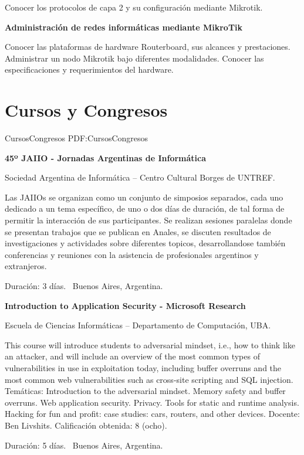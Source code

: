 \documentclass[letterpaper,MMMyyyy,nonstop]{simpleresumecv}
\begin{document}
\begin{body}
\BulletItem Conocer los protocolos de capa 2 y su configuración mediante Mikrotik.

\Gap
\textbf{Administración de redes informáticas mediante MikroTik}
\hfill
{}

\BulletItem Conocer las plataformas de hardware Routerboard, sus alcances y prestaciones. Administrar un nodo Mikrotik bajo diferentes modalidades. Conocer las especificaciones y requerimientos del hardware.


\section{Cursos y \newline	Congresos}
{CursosCongresos}
{PDF:CursosCongresos}

\textbf{45º JAIIO - Jornadas Argentinas de Informática}
\hfill
{}

\BulletItem Sociedad Argentina de Informática – Centro Cultural Borges de UNTREF.
\begin{detail}
	\SubBulletItem
	Las JAIIOs se organizan como un conjunto de simposios separados, cada uno dedicado a un tema específico, de uno o dos días de duración, de tal forma de permitir la interacción de sus participantes. Se realizan sesiones paralelas donde se presentan trabajos que se publican en Anales, se discuten resultados de investigaciones y actividades sobre diferentes topicos, desarrollandose también conferencias y reuniones con la asistencia de profesionales argentinos y extranjeros.
\end{detail}
Duración: 3 días. \SubBulletSymbol\, Buenos Aires, Argentina.

\Gap
\textbf{Introduction to Application Security - Microsoft Research}
\hfill
{}

\BulletItem Escuela de Ciencias Informáticas – Departamento de Computación, UBA.
\begin{detail}
	\SubBulletItem
	This course will introduce students to adversarial mindset, i.e., how to think like an attacker, and will include an overview of the most common types of vulnerabilities in use in exploitation today, including buffer overruns and the most common web vulnerabilities such as cross-site scripting and SQL injection.
	\SubBulletItem
	Temáticas: Introduction to the adversarial mindset. Memory safety and buffer overruns. Web application security. Privacy. Tools for static and runtime analysis. Hacking for fun and profit: case studies: cars, routers, and other devices.
	\SubBulletItem
	Docente: Ben Livshits.
	\SubBulletItem
	Calificación obtenida: 8 (ocho).
\end{detail}
Duración: 5 días. \SubBulletSymbol\, Buenos Aires, Argentina.


\end{body}
\end{document}
